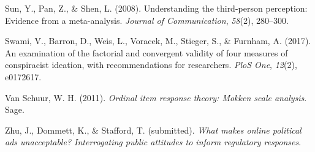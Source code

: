 \documentclass[
  ,jou,floatsintext]{apa6}
\newlength{\cslhangindent}
\newlength{\cslentryspacingunit} %
\newenvironment{CSLReferences}[2] %
 {%
  \setlength{\parindent}{0pt}
  \ifodd #1
  \let\oldpar\par
  \def\par{\hangindent=\cslhangindent\oldpar}
  \fi
  \setlength{\parskip}{#2\cslentryspacingunit}
 }%
 {}
\begin{document}
\begin{CSLReferences}{1}{0}
\leavevmode{}%
Sun, Y., Pan, Z., \& Shen, L. (2008). Understanding the third-person perception: Evidence from a meta-analysis. \emph{Journal of Communication}, \emph{58}(2), 280--300.

\leavevmode{}%
Swami, V., Barron, D., Weis, L., Voracek, M., Stieger, S., \& Furnham, A. (2017). An examination of the factorial and convergent validity of four measures of conspiracist ideation, with recommendations for researchers. \emph{PloS One}, \emph{12}(2), e0172617.

\leavevmode{}%
Van Schuur, W. H. (2011). \emph{Ordinal item response theory: Mokken scale analysis}. Sage.

\leavevmode{}%
Zhu, J., Dommett, K., \& Stafford, T. (submitted). \emph{What makes online political ads unacceptable? Interrogating public attitudes to inform regulatory responses}.

\end{CSLReferences}
\end{document}
